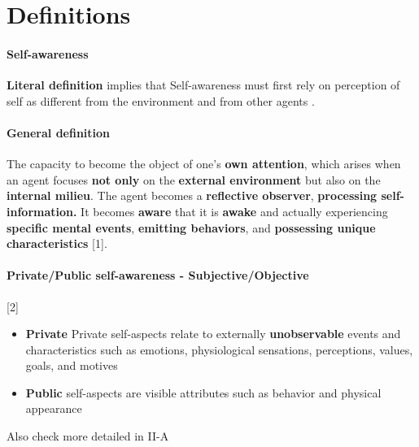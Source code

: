 \documentclass{article}
\begin{document}
	\section{Definitions}
		\paragraph{Self-awareness}
		\textbf{Literal definition} implies that Self-awareness must first rely on perception of self as different from the environment and from other agents \cite{chatila-2018-toward-self-aware-robots}.
		
		\paragraph{General definition} The capacity to become the object of one’s \textbf{own attention}, which arises when an agent focuses \textbf{not only} on the \textbf{external environment} but also on the \textbf{internal milieu}. The agent becomes a \textbf{reflective observer}, \textbf{processing self-information.} It becomes \textbf{aware} that it is \textbf{awake} and actually experiencing \textbf{specific mental events}, \textbf{emitting behaviors}, and \textbf{possessing unique characteristics} \citet{regazzoni-2020-multi-sensorial-generative-and-descriptive-self-awareness-models-for-autonomous-systems}[1].
		
		\paragraph{Private/Public self-awareness - Subjective/Objective}  \citet{regazzoni-2020-multi-sensorial-generative-and-descriptive-self-awareness-models-for-autonomous-systems}[2]
			\begin{itemize}
				\item \textbf{Private} Private self-aspects relate to externally \textbf{unobservable} events and characteristics such as emotions, physiological sensations, perceptions, values, goals, and motives
				\item \textbf{Public} self-aspects are visible attributes such as behavior and physical appearance
			\end{itemize}
			Also check more detailed in \cite{lewis-2011-a-survey-of-self-awareness-and-its-application-in-computing-systems} II-A
\end{document}
